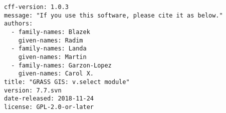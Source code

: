 \documentclass[preview]{standalone}
\begin{document}

\begin{verbatim}
cff-version: 1.0.3
message: "If you use this software, please cite it as below."
authors:
  - family-names: Blazek
    given-names: Radim
  - family-names: Landa
    given-names: Martin
  - family-names: Garzon-Lopez
    given-names: Carol X.
title: "GRASS GIS: v.select module"
version: 7.7.svn
date-released: 2018-11-24
license: GPL-2.0-or-later
\end{verbatim}
\end{document}
